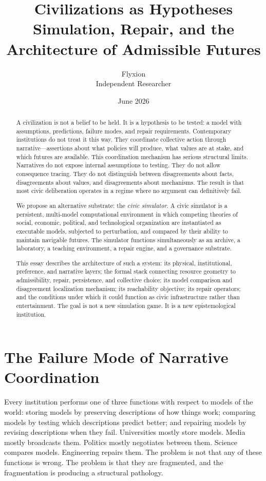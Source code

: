 \documentclass[12pt]{article}
\title{\textbf{Civilizations as Hypotheses}\\
\large Simulation, Repair, and the Architecture of Admissible Futures}
\author{Flyxion \\ \small Independent Researcher}
\date{June 2026}
\begin{document}
\maketitle

\begin{abstract}
\noindent A civilization is not a belief to be held. It is a hypothesis to be tested: a model with assumptions, predictions, failure modes, and repair requirements. Contemporary institutions do not treat it this way. They coordinate collective action through narrative---assertions about what policies will produce, what values are at stake, and which futures are available. This coordination mechanism has serious structural limits. Narratives do not expose internal assumptions to testing. They do not allow consequence tracing. They do not distinguish between disagreements about facts, disagreements about values, and disagreements about mechanisms. The result is that most civic deliberation operates in a regime where no argument can definitively fail.

We propose an alternative substrate: the \emph{civic simulator}. A civic simulator is a persistent, multi-model computational environment in which competing theories of social, economic, political, and technological organization are instantiated as executable models, subjected to perturbation, and compared by their ability to maintain navigable futures. The simulator functions simultaneously as an archive, a laboratory, a teaching environment, a repair engine, and a governance substrate.

This essay describes the architecture of such a system: its physical, institutional, preference, and narrative layers; the formal stack connecting resource geometry to admissibility, repair, persistence, and collective choice; its model comparison and disagreement localization mechanism; its reachability objective; its repair operators; and the conditions under which it could function as civic infrastructure rather than entertainment. The goal is not a new simulation game. It is a new epistemological institution.
\end{abstract}

\vspace{1em}

\section{The Failure Mode of Narrative Coordination}

Every institution performs one of three functions with respect to models of the world: storing models by preserving descriptions of how things work; comparing models by testing which descriptions predict better; and repairing models by revising descriptions when they fail. Universities mostly store models. Media mostly broadcasts them. Politics mostly negotiates between them. Science compares models. Engineering repairs them. The problem is not that any of these functions is wrong. The problem is that they are fragmented, and the fragmentation is producing a structural pathology.
\end{document}
